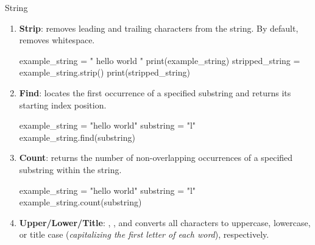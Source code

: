 \documentclass[10pt]{article}
\begin{document}
\begin{core}[label=core:string]{String}
\begin{enumerate}
\begin{pyconsole}
          \end{pyconsole}

          \item \textbf{Strip}:  removes leading and trailing characters from the string. By default,  removes whitespace.

          \begin{pyconsole}

            example_string = "   hello world   "
            print(example_string)
            stripped_string = example_string.strip()
            print(stripped_string)

          \end{pyconsole}

          \item \textbf{Find}:  locates the first occurrence of a specified substring and returns its starting index position.

          \begin{pyconsole}

            example_string = "hello world"
            substring = "l"
            example_string.find(substring)

          \end{pyconsole}

          \item \textbf{Count}:  returns the number of non-overlapping occurrences of a specified substring within the string.

          \begin{pyconsole}

            example_string = "hello world"
            substring = "l"
            example_string.count(substring)

          \end{pyconsole}

          \item \textbf{Upper/Lower/Title}: , , and  converts all characters to uppercase, lowercase, or title case (\textit{capitalizing the first letter of each word}), respectively.


\end{enumerate}
\end{core}
\end{document}
